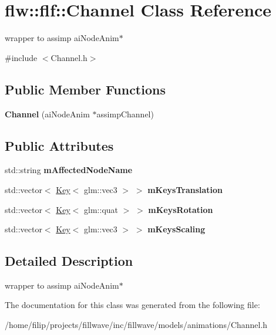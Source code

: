 \hypertarget{classflw_1_1flf_1_1Channel}{}\section{flw\+:\+:flf\+:\+:Channel Class Reference}
\label{classflw_1_1flf_1_1Channel}


wrapper to assimp ai\+Node\+Anim$\ast$  




{\ttfamily \#include $<$Channel.\+h$>$}

\subsection*{Public Member Functions}
\begin{DoxyCompactItemize}
\item 
\mbox{\label{classflw_1_1flf_1_1Channel_a68388e17e6a802feb500298f6ebae8b7}} 
{\bfseries Channel} (ai\+Node\+Anim $\ast$assimp\+Channel)
\end{DoxyCompactItemize}
\subsection*{Public Attributes}
\begin{DoxyCompactItemize}
\item 
\mbox{\label{classflw_1_1flf_1_1Channel_a2be55ddd58a96c0e5f75e27ee5ece8c0}} 
std\+::string {\bfseries m\+Affected\+Node\+Name}
\item 
\mbox{\label{classflw_1_1flf_1_1Channel_a5c976df532a44512d02002054c6fc7db}} 
std\+::vector$<$ \hyperlink{classflw_1_1flf_1_1Key}{Key}$<$ glm\+::vec3 $>$ $>$ {\bfseries m\+Keys\+Translation}
\item 
\mbox{\label{classflw_1_1flf_1_1Channel_a878c9d16a562846be380bf1539da775b}} 
std\+::vector$<$ \hyperlink{classflw_1_1flf_1_1Key}{Key}$<$ glm\+::quat $>$ $>$ {\bfseries m\+Keys\+Rotation}
\item 
\mbox{\label{classflw_1_1flf_1_1Channel_a85e59bc7ef520eab7656af136bc9d43c}} 
std\+::vector$<$ \hyperlink{classflw_1_1flf_1_1Key}{Key}$<$ glm\+::vec3 $>$ $>$ {\bfseries m\+Keys\+Scaling}
\end{DoxyCompactItemize}


\subsection{Detailed Description}
wrapper to assimp ai\+Node\+Anim$\ast$ 

The documentation for this class was generated from the following file\+:\begin{DoxyCompactItemize}
\item 
/home/filip/projects/fillwave/inc/fillwave/models/animations/Channel.\+h\end{DoxyCompactItemize}
